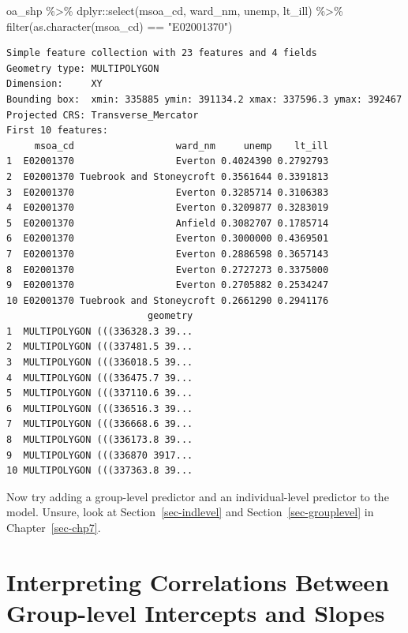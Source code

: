 \documentclass[
  letterpaper,
  DIV=11,
  numbers=noendperiod,
  oneside]{scrreprt}
\newenvironment{Shaded}{\begin{snugshade}}{\end{snugshade}}
\newcommand{\FunctionTok}[1]{\textcolor[rgb]{0.28,0.35,0.67}{#1}}
\newcommand{\NormalTok}[1]{\textcolor[rgb]{0.00,0.23,0.31}{#1}}
\newcommand{\SpecialCharTok}[1]{\textcolor[rgb]{0.37,0.37,0.37}{#1}}
\newcommand{\StringTok}[1]{\textcolor[rgb]{0.13,0.47,0.30}{#1}}
\begin{document}
\begin{Shaded}
\begin{Highlighting}[]
\NormalTok{oa\_shp }\SpecialCharTok{\%\textgreater{}\%}\NormalTok{ dplyr}\SpecialCharTok{::}\FunctionTok{select}\NormalTok{(msoa\_cd, ward\_nm, unemp, lt\_ill) }\SpecialCharTok{\%\textgreater{}\%}
    \FunctionTok{filter}\NormalTok{(}\FunctionTok{as.character}\NormalTok{(msoa\_cd) }\SpecialCharTok{==} \StringTok{"E02001370"}\NormalTok{)}
\end{Highlighting}
\end{Shaded}

\begin{verbatim}
Simple feature collection with 23 features and 4 fields
Geometry type: MULTIPOLYGON
Dimension:     XY
Bounding box:  xmin: 335885 ymin: 391134.2 xmax: 337596.3 ymax: 392467
Projected CRS: Transverse_Mercator
First 10 features:
     msoa_cd                  ward_nm     unemp    lt_ill
1  E02001370                  Everton 0.4024390 0.2792793
2  E02001370 Tuebrook and Stoneycroft 0.3561644 0.3391813
3  E02001370                  Everton 0.3285714 0.3106383
4  E02001370                  Everton 0.3209877 0.3283019
5  E02001370                  Anfield 0.3082707 0.1785714
6  E02001370                  Everton 0.3000000 0.4369501
7  E02001370                  Everton 0.2886598 0.3657143
8  E02001370                  Everton 0.2727273 0.3375000
9  E02001370                  Everton 0.2705882 0.2534247
10 E02001370 Tuebrook and Stoneycroft 0.2661290 0.2941176
                         geometry
1  MULTIPOLYGON (((336328.3 39...
2  MULTIPOLYGON (((337481.5 39...
3  MULTIPOLYGON (((336018.5 39...
4  MULTIPOLYGON (((336475.7 39...
5  MULTIPOLYGON (((337110.6 39...
6  MULTIPOLYGON (((336516.3 39...
7  MULTIPOLYGON (((336668.6 39...
8  MULTIPOLYGON (((336173.8 39...
9  MULTIPOLYGON (((336870 3917...
10 MULTIPOLYGON (((337363.8 39...
\end{verbatim}

Now try adding a group-level predictor and an individual-level predictor
to the model. Unsure, look at Section~\ref{sec-indlevel} and
Section~\ref{sec-grouplevel} in Chapter~\ref{sec-chp7}.

\section{Interpreting Correlations Between Group-level Intercepts and
Slopes}\label{interpreting-correlations-between-group-level-intercepts-and-slopes}
\end{document}
